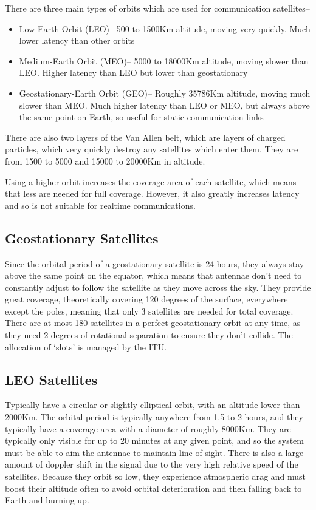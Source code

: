 There are three main types of orbits which are used for communication satellites--
\begin{itemize}
  \item Low-Earth Orbit (LEO)-- 500 to 1500Km altitude, moving very quickly. Much lower latency than other orbits
  \item Medium-Earth Orbit (MEO)-- 5000 to 18000Km altitude, moving slower than LEO. Higher latency than LEO but lower
   than geostationary
  \item Geostationary-Earth Orbit (GEO)-- Roughly 35786Km altitude, moving much slower than MEO. Much higher latency
   than LEO or MEO, but always above the same point on Earth, so useful for static communication links
\end{itemize}

There are also two layers of the Van Allen belt, which are layers of charged particles, which very quickly destroy any
 satellites which enter them. They are from 1500 to 5000 and 15000 to 20000Km in altitude.

Using a higher orbit increases the coverage area of each satellite, which means that less are needed for full coverage.
 However, it also greatly increases latency and so is not suitable for realtime communications.

\subsection*{Geostationary Satellites}

Since the orbital period of a geostationary satellite is 24 hours, they always stay above the same point on the equator,
 which means that antennae don't need to constantly adjust to follow the satellite as they move across the sky. They
 provide great coverage, theoretically covering 120 degrees of the surface, everywhere except the poles, meaning that
 only 3 satellites are needed for total coverage. There are at most 180 satellites in a perfect geostationary orbit
 at any time, as they need 2 degrees of rotational separation to ensure they don't collide. The allocation of `slots'
 is managed by the ITU.

\subsection*{LEO Satellites}

Typically have a circular or slightly elliptical orbit, with an altitude lower than 2000Km. The orbital period is
 typically anywhere from 1.5 to 2 hours, and they typically have a coverage area with a diameter of roughly 8000Km.
 They are typically only visible for up to 20 minutes at any given point, and so the system must be able to aim the
 antennae to maintain line-of-sight. There is also a large amount of doppler shift in the signal due to the very high
 relative speed of the satellites. Because they orbit so low, they experience atmospheric drag and must boost their
 altitude often to avoid orbital deterioration and then falling back to Earth and burning up.

